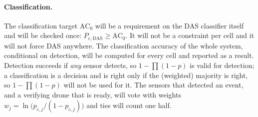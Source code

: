 \documentclass[11pt,a4paper]{article}
\newcommand{\ACzero}{\mathrm{AC}_{0}}
\begin{document}
\paragraph{Classification.} The classification target $\ACzero$ will be a requirement on the DAS classifier itself and will be checked once: $P_{c,\mathrm{DAS}}\ge\ACzero$. It will not be a constraint
per cell and it will not force DAS anywhere. The classification accuracy of the whole system, conditional on detection, will be computed for every cell and reported as a result. Detection succeeds if \emph{any} sensor
detects, so $1-\prod(1-p)$ is valid for detection; a classification is a decision and is right only if the (weighted) majority is right, so $1-\prod(1-p)$ will not be used for it. The sensors that detected an event,
and a verifying drone that is ready, will vote with weights $w_j=\ln\bigl(p_{c,j}/(1-p_{c,j})\bigr)$ and ties will count one half.
\end{document}
